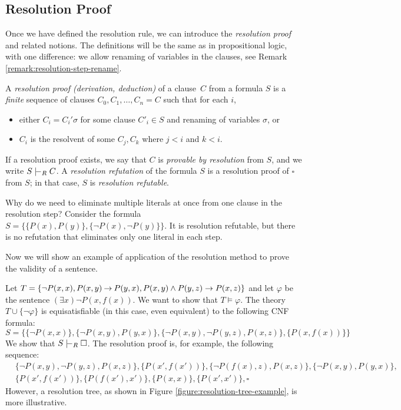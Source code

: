 \subsection{Resolution Proof}

Once we have defined the resolution rule, we can introduce the \emph{resolution proof} and related notions. The definitions will be the same as in propositional logic, with one difference: we allow renaming of variables in the clauses, see Remark \ref{remark:resolution-step-rename}.

\begin{definition}
    A \emph{resolution proof (derivation, deduction)} of a clause~$C$ from a formula $S$ is a \emph{finite} sequence of clauses $C_0,C_1,\dots,C_n=C$
    such that for each $i$,
    \begin{itemize}
        \item either $C_i=C_i'\sigma$ for some clause $C'_i\in S$ and renaming of variables $\sigma$, or
        \item $C_i$ is the resolvent of some $C_j,C_k$ where $j<i$ and $k<i$.
    \end{itemize}
    If a resolution proof exists, we say that $C$ is \emph{provable by resolution} from $S$, and we write $S\proves_R C$. A \emph{resolution refutation} of the formula $S$ is a resolution proof of $\square$ from $S$; in that case, $S$ is \emph{resolution refutable}.
\end{definition}

\begin{remark}
    Why do we need to eliminate multiple literals at once from one clause in the resolution step? Consider the formula $S=\{\{P(x),P(y)\},\{\neg P(x),\neg P(y)\}\}$. It is resolution refutable, but there is no refutation that eliminates only one literal in each step.
\end{remark}

Now we will show an example of application of the resolution method to prove the validity of a sentence.

\begin{example}\label{example:resolution-proof-predicate}
Let $T=\{\neg P(x,x),P(x,y) \mathbin{\rightarrow} P(y,x), P(x,y)\land P(y,z)\to P(x,z)\}$ and let $\varphi$ be the sentence $(\exists x)\neg P(x,f(x))$. We want to show that $T\models\varphi$. The theory $T\cup\{\neg\varphi\}$ is equisatisfiable (in this case, even equivalent) to the following CNF formula:
$$S=\{\{\neg P(x,x)\},\{\neg P(x,y),P(y,x)\},\{\neg P(x,y),\neg P(y,z), P(x,z)\},\{P(x,f(x))\}\}$$
We show that $S\proves_R\square$. The resolution proof is, for example, the following sequence:
\begin{align*}
    &\{\neg P(x,y),\neg P(y,z), P(x,z)\},
    \{P(x',f(x'))\},
    \{\neg P(f(x),z),P(x,z)\},
    \{\neg P(x,y),P(y,x)\},\\
    &\{P(x',f(x'))\},
    \{P(f(x'),x')\},
    \{P(x,x)\},
    \{P(x',x')\},
    \square   
\end{align*}
However, a resolution tree, as shown in Figure \ref{figure:resolution-tree-example}, is more illustrative.
\end{example}

